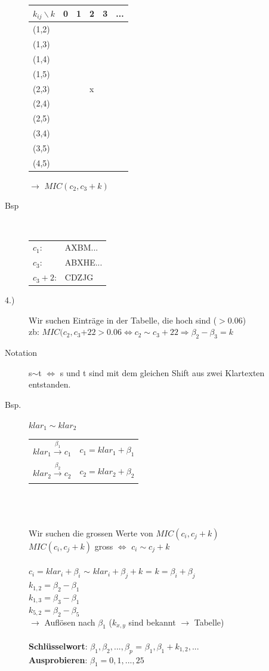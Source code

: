 \documentclass[10pt]{article}
\newcommand{\ra}{\rightarrow}
\newcommand{\Ra}{\Rightarrow}
\begin{document}
\begin{description}
		\begin{tabular}{l | l l l l l}
			$k_{ij}\backslash k$ & 0 & 1 & 2 & 3 & ... \\
			\hline 
			(1,2) \\
			(1,3) \\
			(1,4) \\
			(1,5) \\
			(2,3) & & & x \\
			(2,4) \\
			(2,5) \\
			(3,4) \\
			(3,5) \\
			(4,5) \\
		\end{tabular} $\ra$ $MIC(c_2,c_3+k)$
	\item[Bsp] \hfill \\
		\begin{tabular}{l l}
			$c_1$: & AXBM...\\
			$c_3$: & ABXHE... \\
			\hline
			$c_3+2$: & CDZJG \\
		\end{tabular}
	\item[4.)] Wir suchen Einträge in der Tabelle, die hoch sind ($> 0.06$) \\
		zb: $MIC(c_2,c_3{+22} > 0.06 \Longleftrightarrow c_2 \sim c_3+22 \Ra \beta_2-\beta_3=k$ \\
	\item[Notation] s$\sim$t $\Longleftrightarrow$ s und t sind mit dem gleichen Shift aus zwei Klartexten entstanden.
	\item[Bsp.] $klar_1 \sim klar_2$ \\
		\begin{tabular}{l | l}
			$klar_1 \xrightarrow[]{\beta_1} c_1$ & $c_1 = klar_1+\beta_1$ \\
			$klar_2 \xrightarrow[]{\beta_2} c_2$ & $c_2 = klar_2+\beta_2$ \\
		\end{tabular} \\ \\ \\
		Wir suchen die grossen Werte von $MIC(c_i, c_j +k)$ \\
		$MIC(c_i, c_j +k)$ gross $\Longleftrightarrow$ $c_i \sim c_j + k$ \\ \\
		$c_i=klar_i+\beta_i$ $\sim$ $klar_i + \beta_j + k$ = {\color{red} $k = \beta_i + \beta_j$ }\\
		
		$k_{1,2} = \beta_2 - \beta_1$ \\
		$k_{1,3} = \beta_3 - \beta_1$ \\
		$k_{5,2} = \beta_2 - \beta_5$ \\
		$\ra$ Auflösen nach $\beta_1$ ($k_{x,y}$ sind bekannt $\ra$ Tabelle) \\ \\
		\textbf{Schlüsselwort}: $\beta_1,\beta_2, ..., \beta_p$ = $\beta_1, \beta_1+k_{1,2}, ...$ \\ 
		\textbf{Ausprobieren}: $\beta_1 = 0,1, ..., 25$

\end{description}
\end{document}
